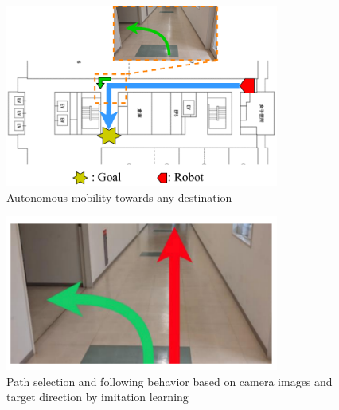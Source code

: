 \begin{figure}[htbp]
     \centering
      \includegraphics[width=90mm]{images/pdf/nav_need.pdf}
      \caption{Autonomous mobility towards any destination}\label{fig:nav_need}
 \end{figure}
 \begin{figure}[htbp]
     \centering
      \includegraphics[width=90mm]{images/pdf/branch_path.pdf}
      \caption{Path selection and following behavior based 
      on camera images and target direction by imitation learning}\label{fig:haru_select}
 \end{figure}
\newpage
